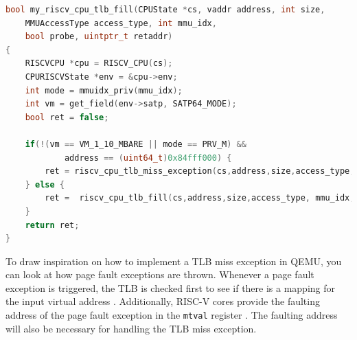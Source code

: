 \begin{lstlisting}[language=c,float=h!,
    caption={Alternative Implementation for the RISC-V tlb\_fill function with a special case to
    start testing TLB Miss Handler implementations.
    In line 11, a conditional branch is used to only trigger the exception when neither the
    Virtual Memory (as set in the \texttt{satp} \texttt{MODE} field) is bare nor the privilege
    mode is the machine mode.
    If the virtual address is the hardcoded one, a TLB miss exception is thrown, otherwise the
    original functions is called, which will perform a page table walk to find the mapping.},
    label={lst:specialCaseTLBfill}]
bool my_riscv_cpu_tlb_fill(CPUState *cs, vaddr address, int size,
    MMUAccessType access_type, int mmu_idx,
    bool probe, uintptr_t retaddr)
{
    RISCVCPU *cpu = RISCV_CPU(cs);
    CPURISCVState *env = &cpu->env;
    int mode = mmuidx_priv(mmu_idx);
    int vm = get_field(env->satp, SATP64_MODE);
    bool ret = false;

    if(!(vm == VM_1_10_MBARE || mode == PRV_M) &&
            address == (uint64_t)0x84fff000) {
        ret = riscv_cpu_tlb_miss_exception(cs,address,size,access_type, mmu_idx, probe, retaddr);
    } else {
        ret =  riscv_cpu_tlb_fill(cs,address,size,access_type, mmu_idx, probe, retaddr);
    }
    return ret;
}
\end{lstlisting}



To draw inspiration on how to implement a TLB miss exception in QEMU, you can look at how
page fault exceptions are thrown.
Whenever a page fault exception is triggered, the TLB is checked first to see if there is a mapping
for the input virtual address \cite{QEMUSource2024}. Additionally, RISC-V cores provide the faulting
address of the page fault exception in the \texttt{mtval} register \cite{RISCVInstructionSet}.
The faulting address will also be necessary for handling the TLB miss exception.




